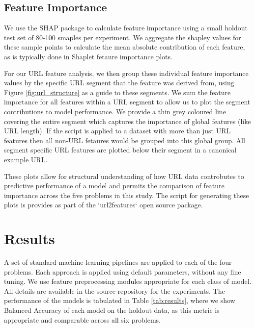 \documentclass[sigconf]{acmart}
\begin{document}
\subsection{Feature Importance}

We use the SHAP\cite{Lundberg2017} package to calculate feature importance using a small holdout test set 
of 80-100 smaples per experiment. We aggregate the shapley values for these sample points to calculate the mean
absolute contribution of each feature, as is typically done in Shaplet fetaure importance plots.

For our URL feature analysis, we then group these individual feature importance values by the specific URL segment
that the feature was derived from, using Figure \ref{fig:url_structure} as a guide to these segments. 
We sum the feature importance for all features within a URL segment to allow us to plot the
segment contributions to model performance. We provide a thin grey coloured line covering the entire segment
which captures the importance of global features (like URL length). If the script is applied to a dataset with
more than just URL features then all non-URL fetaures would be grouped into this global group. All segment specific
URL features are plotted below their segment in a canonical example URL.

These plots allow for structural understanding of how URL data
controbutes to predictive performance of a model and permits the comparison of feature importance 
across the five problems in this study. The script for generating these plots is provides as part of the
`url2features` open source package.

\section{Results}

A set of standard machine learning pipelines are applied to each of the four problems. Each approach is applied
using default parameters, without any fine tuning. We use feature preprocessing modules appropriate for each class
of model. All details are available in the source repository for the experiments. The performance of the models
is tabulated in Table \ref{tab:results}, where we show Balanced Accuracy of each model on the holdout data, as this
metric is appropriate and comparable across all six problems. 
\end{document}
